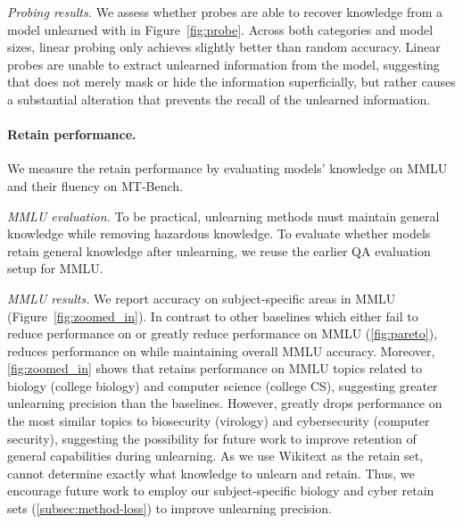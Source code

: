 \textit{Probing results.} We assess whether probes are able to recover knowledge from a model unlearned with \method{} in Figure~\ref{fig:probe}. Across both categories and model sizes, linear probing only achieves slightly better than random accuracy. Linear probes are unable to extract unlearned information from the model, suggesting that \method{} does not merely mask or hide the information superficially, but rather causes a substantial alteration that prevents the recall of the unlearned information.



\paragraph{Retain performance.} We measure the retain performance by evaluating models' knowledge on MMLU and their fluency on MT-Bench.

\textit{MMLU evaluation.} To be practical, unlearning methods must maintain general knowledge while removing hazardous knowledge. To evaluate whether models retain general knowledge after unlearning, we reuse the earlier QA evaluation setup for MMLU. 

\textit{MMLU results.} We report accuracy on subject-specific areas in MMLU (Figure~\ref{fig:zoomed_in}). In contrast to other baselines which either fail to reduce performance on \benchmark{} or greatly reduce performance on MMLU (\cref{fig:pareto}), \method{} reduces performance on \benchmark{} while maintaining overall MMLU accuracy. Moreover, \cref{fig:zoomed_in} shows that \method{} retains performance on MMLU topics related to biology (college biology) and computer science (college CS), suggesting greater unlearning precision than the baselines. However, \method{} greatly drops performance on the most similar topics to biosecurity (virology) and cybersecurity (computer security), suggesting the possibility for future work to improve retention of general capabilities during unlearning. As we use Wikitext as the retain set, \method{} cannot determine exactly what knowledge to unlearn and retain. Thus, we encourage future work to employ our subject-specific biology and cyber retain sets (\cref{subsec:method-loss}) to improve unlearning precision.

